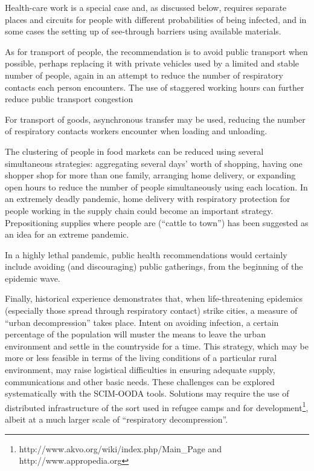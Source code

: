 \documentclass[12pt, a4]{scrartcl}
\begin{document}
Health-care work is a special case and, as discussed below, requires separate places and circuits for people with different probabilities of being infected, and in some cases the setting up of see-through barriers using available materials.

As for transport of people, the recommendation is to avoid public transport when possible, perhaps replacing it with private vehicles used by a limited and stable number of people, again in an attempt to reduce the number of respiratory contacts each person encounters. The use of staggered working hours can further reduce public transport congestion

For transport of goods, asynchronous transfer may be used, reducing the number of respiratory contacts workers encounter when loading and unloading.

The clustering of people in food markets can be reduced using several simultaneous strategies: aggregating several days’ worth of shopping, having one shopper shop for more than one family, arranging home delivery, or expanding open hours to reduce the number of people simultaneously using each location. In an extremely deadly pandemic, home delivery with respiratory protection for people working in the supply chain could become an important strategy. Prepositioning supplies where people are (“cattle to town”) has been suggested as an idea for an extreme pandemic.

In a highly lethal pandemic, public health recommendations would certainly include avoiding (and discouraging) public gatherings, from the beginning of the epidemic wave.

Finally, historical experience demonstrates that, when life-threatening epidemics (especially those spread through respiratory contact) strike cities, a measure of “urban decompression” takes place. Intent on avoiding infection, a certain percentage of the population will muster the means to leave the urban environment and settle in the countryside for a time. This strategy, which may be more or less feasible in terms of the living conditions of a particular rural environment, may raise logistical difficulties in ensuring adequate supply, communications and other basic needs. These challenges can be explored systematically with the SCIM-OODA tools. Solutions may require the use of distributed infrastructure of the sort used in refugee camps and for development\footnote{http://www.akvo.org/wiki/index.php/Main_Page and http://www.appropedia.org}, albeit at a much larger scale of “respiratory decompression”.
\end{document}
